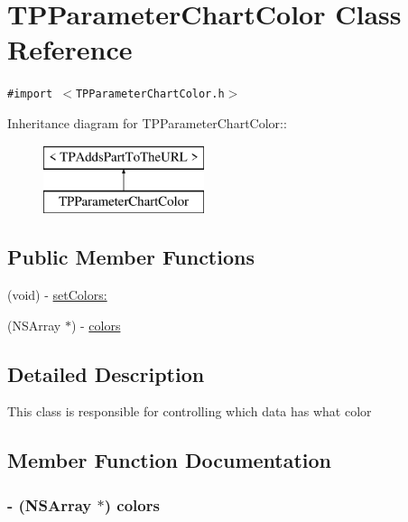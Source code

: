 \hypertarget{interface_t_p_parameter_chart_color}{
\section{TPParameterChartColor Class Reference}
\label{interface_t_p_parameter_chart_color}
}
{\tt \#import $<$TPParameterChartColor.h$>$}

Inheritance diagram for TPParameterChartColor::\begin{figure}[H]
\begin{center}
\leavevmode
\includegraphics[height=2cm]{interface_t_p_parameter_chart_color}
\end{center}
\end{figure}
\subsection*{Public Member Functions}
\begin{CompactItemize}
\item 
(void) - \hyperlink{interface_t_p_parameter_chart_color_21f439b808b2f6a9495c337e740db7b8}{setColors:}
\item 
(NSArray $\ast$) - \hyperlink{interface_t_p_parameter_chart_color_0bbf36caacfc5c1e0aa8014ae75d8756}{colors}
\end{CompactItemize}


\subsection{Detailed Description}
This class is responsible for controlling which data has what color 

\subsection{Member Function Documentation}
\hypertarget{interface_t_p_parameter_chart_color_0bbf36caacfc5c1e0aa8014ae75d8756}{
\subsubsection[{colors}]{\setlength{\rightskip}{0pt plus 5cm}- (NSArray $\ast$) colors }}
\label{interface_t_p_parameter_chart_color_0bbf36caacfc5c1e0aa8014ae75d8756}


